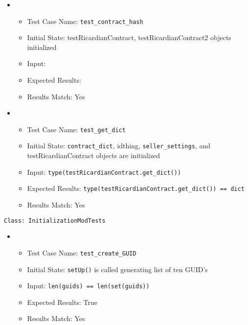 \documentclass{article}
\begin{document}
\begin{itemize}
\item
\begin{itemize}
\item Test Case Name: \texttt{test\_contract\_hash}
\item Initial State: testRicardianContract, testRicardianContract2 objects initialized
\item Input:
\item Expected Results:
\item Results Match: Yes\newline
\end{itemize}
\end{itemize}

\begin{itemize}
\item
\begin{itemize}
\item Test Case Name: \texttt{test\_get\_dict}
\item Initial State: \texttt{contract\_dict}, idthing, \texttt{seller\_settings}, and testRicardianContract objects are initialized
\item Input: \texttt{type(testRicardianContract.\texttt{get\_dict()})}
\item Expected Results: \texttt{type(testRicardianContract.\texttt{get\_dict()}) == dict}
\item Results Match: Yes\newline\newline
\end{itemize}
\end{itemize}

\texttt{Class: InitializationModTests}\newline

\begin{itemize}
\item
\begin{itemize}
\item Test Case Name: \texttt{test\_create\_GUID}
\item Initial State: \texttt{setUp()} is called generating list of ten GUID's
\item Input: \texttt{len(guids) == len(set(guids))}
\item Expected Results: True
\item Results Match: Yes\newline
\end{itemize}
\end{itemize}
\end{document}
